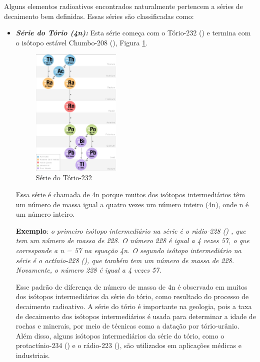 \documentclass[11pt,a4paper]{article}
\begin{document}
                Alguns elementos radioativos encontrados naturalmente pertencem a séries de decaimento bem definidas. Essas séries são classificadas como:
                
                

                \begin{itemize}
                    \item \textbf{\textit{\textcolor{CarnationPink}{Série do Tório (4n):}}} Esta série começa com o Tório-232 () e termina com o isótopo estável Chumbo-208 (), Figura \ref{fig:serieDoTorio}.

                    \begin{figure}[h]
                        \centering
                        \includegraphics[width=0.4\textwidth]{Imagens/serieDoTorio.jpg}
                        \caption{Série do Tório-232}
                        \label{fig:serieDoTorio}
                    \end{figure}

                    Essa série é chamada de 4n porque muitos dos isótopos intermediários têm um número de massa igual a quatro vezes um número inteiro (4n), onde n é um número inteiro.

                        \textbf{Exemplo}: \textit{o primeiro isótopo intermediário na série é o rádio-228 () , que tem um número de massa de 228. O número 228 é igual a 4 vezes 57, o que corresponde a n = 57 na equação 4n. O segundo isótopo intermediário na série é o actínio-228 (), que também tem um número de massa de 228. Novamente, o número 228 é igual a 4 vezes 57.}

                        Esse padrão de diferença de número de massa de 4n é observado em muitos dos isótopos intermediários da série do tório, como resultado do processo de decaimento radioativo. A série do tório é importante na geologia, pois a taxa de decaimento dos isótopos intermediários é usada para determinar a idade de rochas e minerais, por meio de técnicas como a datação por tório-urânio. Além disso, alguns isótopos intermediários da série do tório, como o protactínio-234 () e o rádio-223 (), são utilizados em aplicações médicas e industriais.


\end{itemize}
\end{document}
